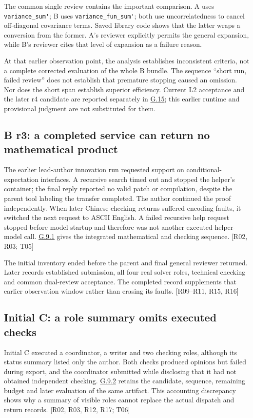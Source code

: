 The common single review contains the important comparison. A uses \nolinkurl{variance_sum'}; B uses \nolinkurl{variance_fun_sum'}; both use uncorrelatedness to cancel off-diagonal covariance terms. Saved library code shows that the latter wraps a conversion from the former. A's reviewer explicitly permits the general expansion, while B's reviewer cites that level of expansion as a failure reason.

At that earlier observation point, the analysis establishes inconsistent criteria, not a complete corrected evaluation of the whole B bundle. The sequence “short run, failed review” does not establish that premature stopping caused an omission. Nor does the short span establish superior efficiency. Current L2 acceptance and the later r4 candidate are reported separately in \hyperlink{g15}{G.15}; this earlier runtime and provisional judgment are not substituted for them.

\subsection[B r3: a completed service can return no mathematical product]{\texorpdfstring{\protect\hypertarget{g3}{}B r3: a completed service can return no mathematical product}{B r3: a completed service can return no mathematical product}}
The earlier lead-author innovation run requested support on conditional-expectation interfaces. A recursive search timed out and stopped the helper's container; the final reply reported no valid patch or compilation, despite the parent tool labeling the transfer completed. The author continued the proof independently. When later Chinese checking returns suffered encoding faults, it switched the next request to ASCII English. A failed recursive help request stopped before model startup and therefore was not another executed helper-model call. \hyperlink{g9-1}{G.9.1} gives the integrated mathematical and checking sequence. [R02, R03; T05]

The initial inventory ended before the parent and final general reviewer returned. Later records established submission, all four real solver roles, technical checking and common dual-review acceptance. The completed record supplements that earlier observation window rather than erasing its faults. [R09–R11, R15, R16]

\subsection[Initial C: a role summary omits executed checks]{\texorpdfstring{\protect\hypertarget{g4}{}Initial C: a role summary omits executed checks}{Initial C: a role summary omits executed checks}}
Initial C executed a coordinator, a writer and two checking roles, although its status summary listed only the author. Both checks produced opinions but failed during export, and the coordinator submitted while disclosing that it had not obtained independent checking. \hyperlink{g9-2}{G.9.2} retains the candidate, sequence, remaining budget and later evaluation of the same artifact. This accounting discrepancy shows why a summary of visible roles cannot replace the actual dispatch and return records. [R02, R03, R12, R17; T06]

